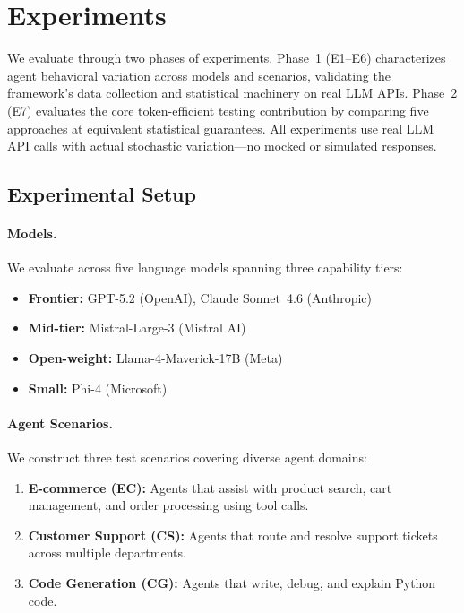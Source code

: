 
\section{Experiments}
\label{sec:experiments}

We evaluate \agentassay{} through two phases of experiments. Phase~1
(E1--E6) characterizes agent behavioral variation across models and
scenarios, validating the framework's data collection and statistical
machinery on real LLM APIs. Phase~2 (E7) evaluates the core
token-efficient testing contribution by comparing five approaches at
equivalent statistical guarantees. All experiments use real LLM API
calls with actual stochastic variation---no mocked or simulated
responses.

\subsection{Experimental Setup}
\label{sec:experiments:setup}

\paragraph{Models.}
We evaluate across five language models spanning three capability
tiers:
\begin{itemize}[leftmargin=*]
  \item \textbf{Frontier:} GPT-5.2 (OpenAI), Claude Sonnet~4.6
    (Anthropic)
  \item \textbf{Mid-tier:} Mistral-Large-3 (Mistral AI)
  \item \textbf{Open-weight:} Llama-4-Maverick-17B (Meta)
  \item \textbf{Small:} Phi-4 (Microsoft)
\end{itemize}

\paragraph{Agent Scenarios.}
We construct three test scenarios covering diverse agent domains:
\begin{enumerate}[leftmargin=*]
  \item \textbf{E-commerce (EC):} Agents that assist with product
    search, cart management, and order processing using tool calls.
  \item \textbf{Customer Support (CS):} Agents that route and resolve
    support tickets across multiple departments.
  \item \textbf{Code Generation (CG):} Agents that write, debug, and
    explain Python code.
\end{enumerate}

